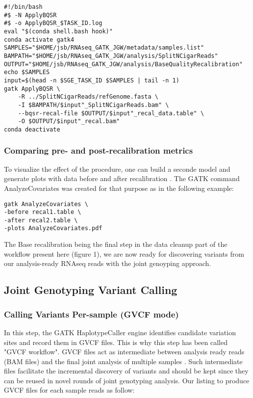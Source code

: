 \begin{verbatim}
#!/bin/bash
#$ -N ApplyBQSR
#$ -o ApplyBQSR_$TASK_ID.log
eval "$(conda shell.bash hook)"
conda activate gatk4
SAMPLES="$HOME/jsb/RNAseq_GATK_JGW/metadata/samples.list"
BAMPATH="$HOME/jsb/RNAseq_GATK_JGW/analysis/SplitNCigarReads"
OUTPUT="$HOME/jsb/RNAseq_GATK_JGW/analysis/BaseQualityRecalibration"
echo $SAMPLES
input=$(head -n $SGE_TASK_ID $SAMPLES | tail -n 1)
gatk ApplyBQSR \
	-R ../SplitNCigarReads/refGenome.fasta \
	-I $BAMPATH/$input"_SplitNCigarReads.bam" \
	--bqsr-recal-file $OUTPUT/$input"_recal_data.table" \
	-O $OUTPUT/$input"_recal.bam"
conda deactivate
\end{verbatim}

\subsubsection{Comparing pre- and post-recalibration metrics}

To visualize the effect of the procedure, one can build a seconde model and generate plots with data before and after recalibration \cite{GATK_BaseQuality}. The GATK command AnalyzeCovariates was created for that purpose as in the following example:

\begin{verbatim}
gatk AnalyzeCovariates \
-before recal1.table \
-after recal2.table \
-plots AnalyzeCovariates.pdf
\end{verbatim}

The Base recalibration being the final step in the data cleanup part of the workflow present here (figure 1), we are now ready for discovering variants from our analysis-ready RNAseq reads with the joint genoyping approach.

\subsection{Joint Genotyping Variant Calling}

\subsubsection{Calling Variants Per-sample (GVCF mode)}

In this step, the GATK HaplotypeCaller engine identifies candidate variation sites and record them in GVCF files. This is why this step has been called "GVCF workflow". GVCF files act as intermediate between analysis ready reads (BAM files) and the final joint analysis of multiple samples \cite{GATK_jointCalling_1}. Such intermediate files facilitate the incremental discovery of variants and should be kept since they can be reused in novel rounds of joint genotyping analysis. Our listing to produce GVCF files for each sample reads as follow:


